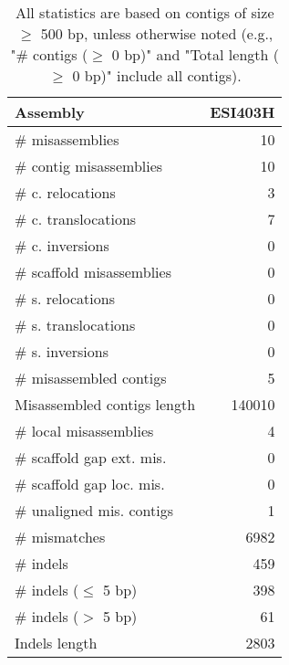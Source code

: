 \documentclass[12pt,a4paper]{article}
\begin{document}
\begin{table}[ht]
\begin{center}
\caption{All statistics are based on contigs of size $\geq$ 500 bp, unless otherwise noted (e.g., "\# contigs ($\geq$ 0 bp)" and "Total length ($\geq$ 0 bp)" include all contigs).}
\begin{tabular}{|l*{1}{|r}|}
\hline
Assembly & ESI403H \\ \hline
\# misassemblies & 10 \\ \hline
\hspace{2mm}\# contig misassemblies & 10 \\ \hline
\hspace{5mm}\# c. relocations & 3 \\ \hline
\hspace{5mm}\# c. translocations & 7 \\ \hline
\hspace{5mm}\# c. inversions & 0 \\ \hline
\hspace{2mm}\# scaffold misassemblies & 0 \\ \hline
\hspace{5mm}\# s. relocations & 0 \\ \hline
\hspace{5mm}\# s. translocations & 0 \\ \hline
\hspace{5mm}\# s. inversions & 0 \\ \hline
\# misassembled contigs & 5 \\ \hline
Misassembled contigs length & 140010 \\ \hline
\# local misassemblies & 4 \\ \hline
\# scaffold gap ext. mis. & 0 \\ \hline
\# scaffold gap loc. mis. & 0 \\ \hline
\# unaligned mis. contigs & 1 \\ \hline
\# mismatches & 6982 \\ \hline
\# indels & 459 \\ \hline
\hspace{5mm}\# indels ($\leq$ 5 bp) & 398 \\ \hline
\hspace{5mm}\# indels ($>$ 5 bp) & 61 \\ \hline
Indels length & 2803 \\ \hline
\end{tabular}
\end{center}
\end{table}
\end{document}
